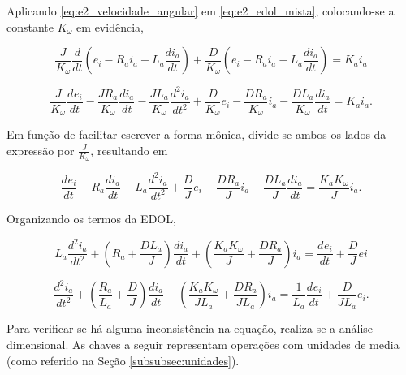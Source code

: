 \documentclass{article}
\numberwithin{equation}{section}
\newcommand{\dei}[1]{\dfrac{d^{#1}e_i}{dt^{#1}}}
\let\l\left
\let\r\right
\let\dfr\dfrac
\begin{document}
\noindent Aplicando \eqref{eq:e2_velocidade_angular} em \eqref{eq:e2_edol_mista}, colocando-se a constante $K_{\omega}$ em evidência,

\begin{equation*}
    \dfr{J}{K_{\omega}} \dfr{d}{dt}\l( e_i - R_a i_a - L_a \dfr{di_a}{dt} \r) + \dfr{D}{K_{\omega}} \l( e_i - R_a i_a - L_a \dfr{di_a}{dt} \r) = K_a i_a
\end{equation*}

\begin{equation*}
    \dfr{J}{K_{\omega}} \dei{ } - \dfr{J R_a}{K_{\omega}} \dfr{di_a}{dt} - \dfr{J L_a}{K_{\omega}} \dfr{d^2i_a}{dt^2} + \dfr{D}{K_{\omega}} e_i - \dfr{D R_a}{K_{\omega}} i_a - \dfr{D L_a}{K_{\omega}} \dfr{di_a}{dt} = K_a i_a.
\end{equation*}

\noindent Em função de facilitar escrever a forma mônica, divide-se ambos os lados da expressão por $\frac{J}{K_{\omega}}$, resultando em

\begin{equation*}
    \dei{ } - R_a\dfr{di_a}{dt} - L_a\dfr{d^2i_a}{dt^2} + \dfr{D}{J} e_i - \dfr{D R_a}{J} i_a - \dfr{D L_a}{J} \dfr{di_a}{dt} = \dfr{K_a K_{\omega}}{J} i_a.
\end{equation*}

\noindent Organizando os termos da EDOL,

\begin{equation*}
    L_a \dfr{d^2i_a}{dt^2} + \l(R_a + \dfr{D L_a}{J}\r)\dfr{di_a}{dt} + \l(\dfr{K_a K_{\omega}}{J} + \dfr{D R_a}{J}\r)i_a = \dei{ } + \dfr{D}{J} ei
\end{equation*}

\begin{equation}
    \dfr{d^2i_a}{dt^2} + \l(\dfr{R_a}{L_a} + \dfr{D}{J}\r)\dfr{di_a}{dt} + \l(\dfr{K_a K_{\omega}}{J L_a} + \dfr{D R_a}{J L_a}\r)i_a = \dfr{1}{L_a}\dei{ } + \dfr{D}{J L_a} e_i. \label{eq:e2_edol_monica}
\end{equation}

\noindent Para verificar se há alguma inconsistência na equação, realiza-se a análise dimensional. As chaves a seguir representam operações com unidades de media (como referido na Seção \ref{subsubsec:unidades}).
\end{document}
